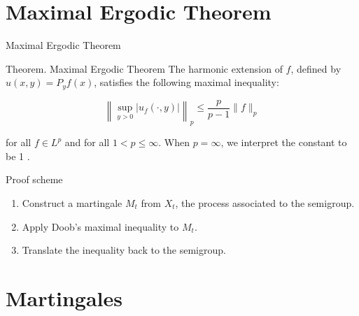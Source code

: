 \documentclass{if-beamer}
\begin{document}
\section{Maximal Ergodic Theorem}

\begin{frame}{Maximal Ergodic Theorem}
    \begin{block}{Theorem. Maximal Ergodic Theorem}
        The harmonic extension of $f$, defined by $u(x, y) = P_y f(x)$, satisfies the following maximal inequality:

        \[
        \left\|\sup _{y>0} | u_f(\cdot, y)|\right\|_p \leq \frac{p}{p-1}\| f \|_p
        \]

        for all $f \in L^p$ and for all $1<p \leq \infty$. When $p=\infty$, we interpret the constant to be 1 .
    \end{block}
    \begin{block}{Proof scheme}
        \begin{enumerate}
            \item Construct a martingale $M_t$ from $X_t$, the process associated to the semigroup.
            \item Apply Doob's maximal inequality to $M_t$.
            \item Translate the inequality back to the semigroup.
        \end{enumerate}
    \end{block}

\end{frame}

\section{Martingales}
\end{document}
